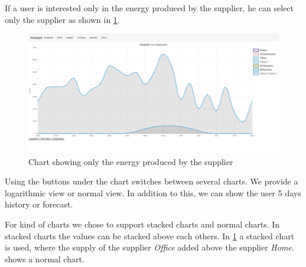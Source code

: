 If a user is interested only in the energy produced by the supplier, he can select only the supplier as shown in \cref{fig:supplierChart}.

\begin{figure}[!h]
    \centering
\includegraphics[width=1.00\textwidth]{../figures/SupplierStacked.png}
    \caption{Chart showing only the energy produced by the supplier}
    \label{fig:supplierChart}
\end{figure}

Using the buttons under the chart switches between several charts.
We provide a logarithmic view or normal view.
In addition to this, we can show the user 5 days history or forecast.

For kind of charts we chose to support stacked charts and normal charts.
In stacked charts the values can be stacked above each others.
In  \cref{fig:supplierChart} a stacked chart is used, where the supply of the supplier \textit{Office} added above the supplier \textit{Home}.
 shows a normal chart.